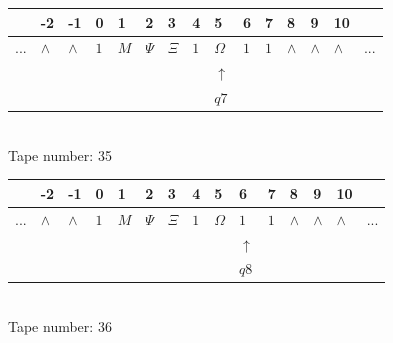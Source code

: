 \documentclass[11pt]{article}
\begin{document}
\begin{table}[H]
\centering
\begin{tabular}{lllllllllllllll}
 & -2 & -1 & 0 & 1 & 2 & 3 & 4 & 5 & 6 & 7 & 8 & 9 & 10 & \\
\hline
$...$ & \multicolumn{1}{|l|}{$\wedge$} & \multicolumn{1}{|l|}{$\wedge$} & \multicolumn{1}{|l|}{$1$} & \multicolumn{1}{|l|}{$M$} & \multicolumn{1}{|l|}{$\Psi$} & \multicolumn{1}{|l|}{$\Xi$} & \multicolumn{1}{|l|}{$1$} & \multicolumn{1}{|l|}{$\Omega$} & \multicolumn{1}{|l|}{$1$} & \multicolumn{1}{|l|}{$1$} & \multicolumn{1}{|l|}{$\wedge$} & \multicolumn{1}{|l|}{$\wedge$} & \multicolumn{1}{|l|}{$\wedge$} & $...$\\
\hline
&  &  &  &  &  &  &  & $\uparrow$ &  &  &  &  &  &  \\
&  &  &  &  &  &  &  & $ q7 $ &  &  &  &  &  &  \\
\end{tabular}
\\
Tape number: 35
\noindent\makebox[\linewidth]{\hdashrule{\textwidth}{1pt}{1pt}}\end{table}
\clearpage

\begin{table}[H]
\centering
\begin{tabular}{lllllllllllllll}
 & -2 & -1 & 0 & 1 & 2 & 3 & 4 & 5 & 6 & 7 & 8 & 9 & 10 & \\
\hline
$...$ & \multicolumn{1}{|l|}{$\wedge$} & \multicolumn{1}{|l|}{$\wedge$} & \multicolumn{1}{|l|}{$1$} & \multicolumn{1}{|l|}{$M$} & \multicolumn{1}{|l|}{$\Psi$} & \multicolumn{1}{|l|}{$\Xi$} & \multicolumn{1}{|l|}{$1$} & \multicolumn{1}{|l|}{$\Omega$} & \multicolumn{1}{|l|}{$1$} & \multicolumn{1}{|l|}{$1$} & \multicolumn{1}{|l|}{$\wedge$} & \multicolumn{1}{|l|}{$\wedge$} & \multicolumn{1}{|l|}{$\wedge$} & $...$\\
\hline
&  &  &  &  &  &  &  &  & $\uparrow$ &  &  &  &  &  \\
&  &  &  &  &  &  &  &  & $ q8 $ &  &  &  &  &  \\
\end{tabular}
\\
Tape number: 36
\noindent\makebox[\linewidth]{\hdashrule{\textwidth}{1pt}{1pt}}\end{table}
\end{document}
